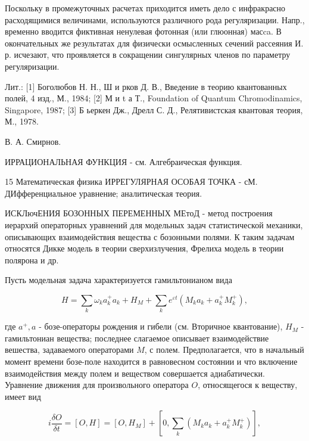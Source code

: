 \documentclass[10pt]{article}
\begin{document}
Поскольку в промежуточных расчетах приходится иметь дело с инфракрасно расходящимися величинами, используются различного рода регуляризации. Напр., временно вводится фиктивная ненулевая фотонная (или глюонная) масca. В окончательных же результатах для физически осмысленных сечений рассеяния И. р. исчезают, что проявляется в сокращении сингулярных членов по параметру регуляризации.



Лит.: [1] Боголюбов Н. Н., Ш и рков Д. В., Введение в теорию квантованных полей, 4 изд., М., 1984; [2] М и t а Т., Foundation of Quantum Chromodinamics, Singapore, 1987; [3] Б ьеркен Дж., Дрелл С. Д., Релятивистская квантовая теория, М., 1978.



В. А. Смирнов.



ИРРАЦИОНАЛЬНАЯ ФУНКЦИЯ - см. Алгебраическая функция.



15 Математическая физика ИРРЕГУЛЯРНАЯ ОСОБАЯ ТОЧКА - сМ. ДИфференциальное уравнение; аналитическая теория.



ИСКЛючЕНИЯ БОЗОННЫХ ПЕРЕМЕННЫХ МЕтоД - метод построения иерархий операторных уравнений для модельных задач статистической механики, описывающих взаимодействия вещества с бозонными полями. К таким задачам относятся Дикке модель в теории сверхизлучения, Фрелиха модель в теории полярона и др.



Пусть модельная задача характеризуется гамильтонианом вида



\[

H=\sum_{k} \omega_{k} a_{k}^{+} a_{k}+H_{M}+\sum_{k} e^{\varepsilon t}\left(M_{k} a_{k}+a_{k}^{+} M_{k}^{+}\right),

\]



где $a^{+}, a$ - бозе-операторы рождения и гибели (см. Вторичное квантование), $H_{M}$ - гамильтониан вещества; последнее слагаемое описывает взаимодействие вешества, задаваемого операторами $M$, с полем. Предполагается, что в начальный момент времени бозе-поле находится в равновесном состоянии и что включение взаимодействия между полем и веществом совершается адиабатически. Уравнение движения для произвольного оператора $O$, относящегося к веществу, имеет вид



\[

i \frac{\delta O}{\delta t}=[O, H]=\left[O, H_{M}\right]+\left[0, \sum_{k}\left(M_{k} a_{k}+a_{k}^{+} M_{k}^{+}\right)\right],

\]
\end{document}
